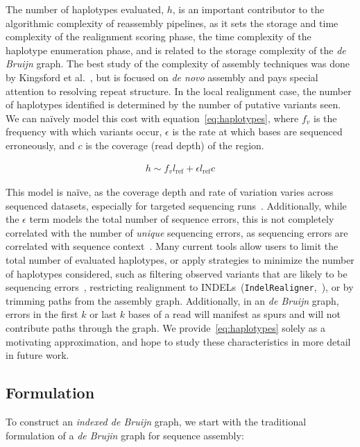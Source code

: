 \documentclass[masters]{ucbthesis}
\begin{document}
The number of haplotypes evaluated, $h$, is an important contributor to the algorithmic complexity of
reassembly pipelines, as it sets the storage and time complexity of the realignment scoring phase, the
time complexity of the haplotype enumeration phase, and is related to the storage complexity of the
\emph{de Bruijn} graph. The best study of the complexity of assembly techniques was done by Kingsford
et al.~\cite{kingsford10}, but is focused on \emph{de novo} assembly and pays special attention to
resolving repeat structure. In the local realignment case, the number of haplotypes identified is determined
by the number of putative variants seen. We can na\"{i}vely model this cost with equation~\eqref{eq:haplotypes},
where $f_v$ is the frequency with which variants occur, $\epsilon$ is the rate at which bases are
sequenced erroneously, and $c$ is the coverage (read depth) of the region.

\begin{align}
\label{eq:haplotypes}
h \sim f_v l_{\text{ref}} + \epsilon l_{\text{ref}} c
\end{align}

This model is na\"{i}ve, as the coverage depth and rate of variation varies across sequenced datasets,
especially for targeted sequencing runs~\cite{fang14}. Additionally, while the $\epsilon$ term models the
total number of sequence errors, this is not completely correlated with the number of \emph{unique}
sequencing errors, as sequencing errors are correlated with sequence context~\cite{depristo11}. Many
current tools allow users to limit the total number of evaluated haplotypes, or apply strategies to minimize
the number of haplotypes considered, such as filtering observed variants that are likely to be sequencing
errors~\cite{garrison12}, restricting realignment to INDELs~(\texttt{IndelRealigner},~\cite{depristo11}), or
by trimming paths from the assembly graph. Additionally, in an \emph{de Bruijn} graph, errors in the
first $k$ or last $k$ bases of a read will manifest as spurs and will not contribute paths through the graph. We provide~\eqref{eq:haplotypes} solely as a motivating
approximation, and hope to study these characteristics in more detail in future work.

\subsection{Formulation}
\label{sec:formulation}

To construct an \emph{indexed de Bruijn} graph, we start with the traditional formulation of a \emph{de
Brujin} graph for sequence assembly:
\end{document}
